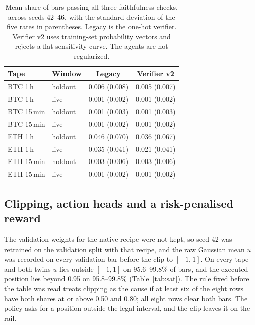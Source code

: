 \documentclass[conference]{IEEEtran}
\begin{document}
\begin{table}[!htb]
\caption{Mean share of bars passing all three faithfulness checks, across seeds 42--46, with the standard deviation of the five rates in parentheses. Legacy is the one-hot verifier. Verifier v2 uses training-set probability vectors and rejects a flat sensitivity curve. The agents are not regularized.}
\label{tab:v2faith}
\centering
\footnotesize
\setlength{\tabcolsep}{4pt}
\begin{tabular}{@{}ll cc@{}}
\toprule
Tape & Window & Legacy & Verifier v2\\
\midrule
BTC 1\,h & holdout & 0.006 (0.008) & 0.005 (0.007)\\
BTC 1\,h & live & 0.001 (0.002) & 0.001 (0.002)\\
BTC 15\,min & holdout & 0.001 (0.003) & 0.001 (0.003)\\
BTC 15\,min & live & 0.001 (0.002) & 0.001 (0.002)\\
ETH 1\,h & holdout & 0.046 (0.070) & 0.036 (0.067)\\
ETH 1\,h & live & 0.035 (0.041) & 0.021 (0.041)\\
ETH 15\,min & holdout & 0.003 (0.006) & 0.003 (0.006)\\
ETH 15\,min & live & 0.001 (0.002) & 0.001 (0.002)\\
\bottomrule
\end{tabular}
\end{table}

\subsection{Clipping, action heads and a risk-penalised reward}
\label{sec:clip}
The validation weights for the native recipe were not kept, so seed 42 was retrained on the validation split with that recipe, and the raw Gaussian mean $u$ was recorded on every validation bar before the clip to $[-1,1]$. On every tape and both twins $u$ lies outside $[-1,1]$ on 95.6--99.8\% of bars, and the executed position lies beyond 0.95 on 95.8--99.8\% (Table~\ref{tab:sat}). The rule fixed before the table was read treats clipping as the cause if at least six of the eight rows have both shares at or above 0.50 and 0.80; all eight rows clear both bars. The policy asks for a position outside the legal interval, and the clip leaves it on the rail.
\end{document}
